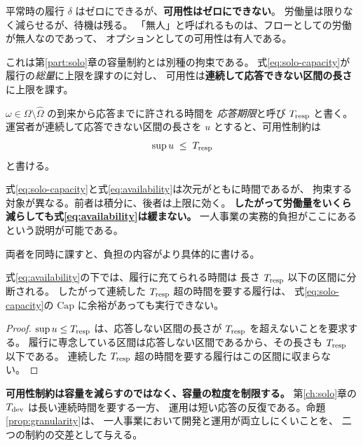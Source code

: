 平常時の履行 $\delta$ はゼロにできるが、\textbf{可用性はゼロにできない}。
労働量は限りなく減らせるが、待機は残る。
「無人」と呼ばれるものは、フローとしての労働が無人なのであって、
オプションとしての可用性は有人である。

これは第\ref{part:solo}章の容量制約とは別種の拘束である。
式\eqref{eq:solo-capacity}が履行の\emph{総量}に上限を課すのに対し、
可用性は\textbf{連続して応答できない区間の長さ}に上限を課す。

\begin{definition}[応答期限と可用性制約]
\label{def:availability}
$\omega\in\Omega\setminus\hat\Omega$ の到来から応答までに許される時間を
\emph{応答期限}と呼び $T_{\rm resp}$ と書く。
運営者が連続して応答できない区間の長さを $u$ とすると、可用性制約は
\begin{equation}
\sup u \;\leq\; T_{\rm resp}
\label{eq:availability}
\end{equation}
と書ける。
\end{definition}

式\eqref{eq:solo-capacity}と式\eqref{eq:availability}は次元がともに時間であるが、
拘束する対象が異なる。前者は積分に、後者は上限に効く。
\textbf{したがって労働量をいくら減らしても式\eqref{eq:availability}は緩まない。}
一人事業の実務的負担がここにあるという説明が可能である。

両者を同時に課すと、負担の内容がより具体的に書ける。

\begin{proposition}[可用性は容量の粒度を制限する]
\label{prop:granularity}
式\eqref{eq:availability}の下では、履行に充てられる時間は
長さ $T_{\rm resp}$ 以下の区間に分断される。
したがって連続した $T_{\rm resp}$ 超の時間を要する履行は、
式\eqref{eq:solo-capacity}の $\mathrm{Cap}$ に余裕があっても実行できない。
\end{proposition}

\begin{proof}
$\sup u\leq T_{\rm resp}$ は、応答しない区間の長さが $T_{\rm resp}$ を超えないことを要求する。
履行に専念している区間は応答しない区間であるから、その長さも $T_{\rm resp}$ 以下である。
連続した $T_{\rm resp}$ 超の時間を要する履行はこの区間に収まらない。
\end{proof}

\textbf{可用性制約は容量を減らすのではなく、容量の粒度を制限する。}
第\ref{ch:solo}章の $T_{\rm dev}$ は長い連続時間を要する一方、
運用は短い応答の反復である。命題\ref{prop:granularity}は、
一人事業において開発と運用が両立しにくいことを、
二つの制約の交差として与える。


